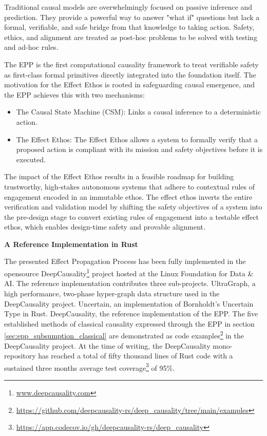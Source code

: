 Traditional causal models are overwhelmingly focused on passive inference and prediction. They provide a powerful way to answer "what if" questions but lack a formal, verifiable, and safe bridge from that knowledge to taking action. Safety, ethics, and alignment are treated as post-hoc problems to be solved with testing and ad-hoc rules.

The EPP is the first computational causality framework to treat verifiable safety as first-class formal primitives directly integrated into the foundation itself. The motivation for the Effect Ethos is rooted in safeguarding causal emergence, and the EPP achieves this with two mechanisms:

\begin{itemize}
\item The Causal State Machine (CSM):  Links a causal inference to a deterministic action.
\item The Effect Ethos: The Effect Ethos allows a system to formally verify that a proposed action is compliant with its mission and safety objectives before it is executed.
\end{itemize}

The impact of the Effect Ethos results in a feasible roadmap for building trustworthy, high-stakes autonomous systems that adhere to contextual rules of engagement encoded in an immutable ethos. The effect ethos inverts the entire verification and validation model by shifting the safety objectives of a system into the pre-design stage to convert existing rules of engagement into a testable effect ethos, which enables design-time safety and provable alignment.

\textbf{A Reference Implementation in Rust}

The presented Effect Propagation Process has been fully implemented in the open\-source DeepCausality\footnote{\url{www.deepcausality.com}} project hosted at the Linux Foundation for Data \& AI. The reference implementation contributes three sub-projects. UltraGraph, a high performance, two-phase hyper-graph data structure used in the DeepCausality project. Uncertain, an implementation of Bornholdt's Uncertain Type in Rust. DeepCausality, the reference implementation of the EPP. The five established methods of classical causality expressed through the EPP in section \ref{sec:epp_subsumption_classical} are demonstrated as code examples\footnote{\url{https://github.com/deepcausality-rs/deep_causality/tree/main/examples}} in the DeepCausality project. At the time of writing, the DeepCausality mono-repository has reached a total of fifty thousand lines of Rust code with a sustained three months average test coverage\footnote{\url{https://app.codecov.io/gh/deepcausality-rs/deep_causality}} of 95\%. 


